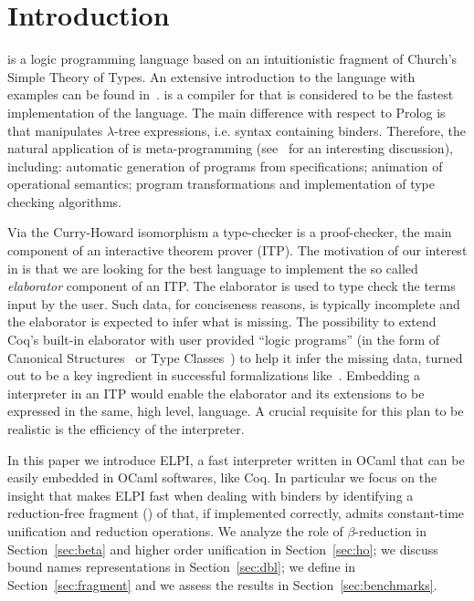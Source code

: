 \documentclass{llncs}
\begin{document}
\section{Introduction}%
\lp{} is a logic programming language based on an intuitionistic fragment of
Church's Simple Theory of Types. An extensive introduction to the language
with examples can be found in~\cite{Miller:2012:PHL:2331097}. \tedius{}
\cite{DBLP:conf/cade/NadathurM99,DBLP:journals/jar/LiangNQ04} is a
compiler for \lp{} %
that is considered to be the fastest
implementation of the language. 
The main difference with respect to Prolog is that \lp{} manipulates
$\lambda$-tree expressions, i.e. syntax containing binders. Therefore, the
natural application of \lp{} is meta-programming (see~\cite{LPAZ} for
an interesting discussion), including: automatic generation of programs from
specifications; animation of operational semantics;
program transformations and implementation of type checking algorithms.

Via the Curry-Howard isomorphism a type-checker is a proof-checker, the main
component of an interactive theorem prover (ITP). The motivation of our
interest in \lp{} is that we are looking for the best 
language to implement the so called \emph{elaborator} component of an ITP.
The elaborator is used to type check the terms input by
the user. Such data, for conciseness reasons, is typically incomplete and
the elaborator is expected to infer what is missing. The possibility to
extend Coq's built-in elaborator with user provided ``logic programs'' (in the
form of
Canonical Structures~\cite{hints2,hints}
or
Type Classes~\cite{TCcoq}) to help it infer 
the missing data, %
turned out to be a key ingredient in successful formalizations
like~\cite{gonthier:hal-00816699}. Embedding a \lp{} interpreter in an ITP
would enable the elaborator and its extensions to be expressed in the same,
high level, language. A crucial requisite for this plan to be realistic is
the efficiency of the \lp{} interpreter.

In this paper we introduce ELPI, a fast \lp{} interpreter written in OCaml
that can be easily embedded in OCaml softwares, like Coq.
In particular we focus on the insight that makes ELPI fast when dealing with
binders by identifying a reduction-free fragment (\rff{}) of \lp{} that, if
implemented correctly, admits constant-time unification and reduction
operations.
We analyze the role of $\beta$-reduction in Section~\ref{sec:beta} and
higher order unification in Section~\ref{sec:ho}; we discuss bound names
representations in Section~\ref{sec:dbl}; we define \rff{} 
in Section~\ref{sec:fragment} and we assess the results in
Section~\ref{sec:benchmarks}.
\end{document}
